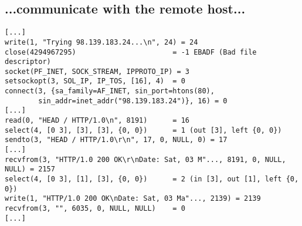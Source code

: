 \documentclass[xga]{xdvislides}
\begin{document}
\subsection{...communicate with the remote host...}
\begin{verbatim}
[...]
write(1, "Trying 98.139.183.24...\n", 24) = 24
close(4294967295)                       = -1 EBADF (Bad file descriptor)
socket(PF_INET, SOCK_STREAM, IPPROTO_IP) = 3
setsockopt(3, SOL_IP, IP_TOS, [16], 4)  = 0
connect(3, {sa_family=AF_INET, sin_port=htons(80),
        sin_addr=inet_addr("98.139.183.24")}, 16) = 0
[...]
read(0, "HEAD / HTTP/1.0\n", 8191)      = 16
select(4, [0 3], [3], [3], {0, 0})      = 1 (out [3], left {0, 0})
sendto(3, "HEAD / HTTP/1.0\r\n", 17, 0, NULL, 0) = 17
[...]
recvfrom(3, "HTTP/1.0 200 OK\r\nDate: Sat, 03 M"..., 8191, 0, NULL, NULL) = 2157
select(4, [0 3], [1], [3], {0, 0})      = 2 (in [3], out [1], left {0, 0})
write(1, "HTTP/1.0 200 OK\nDate: Sat, 03 Ma"..., 2139) = 2139
recvfrom(3, "", 6035, 0, NULL, NULL)    = 0
[...]
\end{verbatim}
\end{document}

